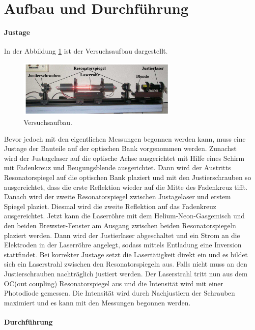 \newpage
\section{Aufbau und Durchführung}
\label{sec:Durchführung}
\paragraph{Justage}
In der Abbildung \ref{fig:aufbau} ist
der Versuchsaufbau dargestellt.
\begin{figure}
  \centering
  \includegraphics[width=0.7\textwidth]{figures/Aufbau.PNG}
  \caption{Versuchsaufbau.}
  \label{fig:aufbau}
\end{figure}
Bevor jedoch mit den eigentlichen Messungen
begonnen werden
kann, muss eine Justage der Bauteile auf der optischen Bank vorgenommen werden.
Zunachst wird der Justagelaser auf die optische Achse
ausgerichtet
mit Hilfe eines Schirm mit Fadenkreuz und Beugungsblende
ausgerichtet.
Dann wird der Austritts Resonatorspiegel
auf die optischen Bank plaziert
und mit den Justierschrauben so ausgereichtet,
dass die erste Reflektion wieder auf die
Mitte des Fadenkreuz tifft.
Danach wird der
zweite Resonatorspiegel zwischen Justagelaser
und erstem Spiegel plaziet.
Diesmal wird die zweite Reflektion
auf das Fadenkreuz ausgereichtet.
Jetzt kann die Laserröhre mit dem Helium-Neon-Gasgemisch und
den beiden Brewster-Fenster am Ausgang
zwischen beiden Resonatorspiegeln
plaziert werden.
Dann wird der Justierlaser abgeschaltet
und ein Strom an die
Elektroden in der Laserröhre
angelegt, sodass mittels Entladung eine Inversion
stattfindet. Bei korrekter
Justage setzt die Lasertätigkeit direkt ein
und es bildet sich ein Laserstrahl
zwischen den Resonatorspiegeln aus.
Falls nicht muss an den Justierschrauben
nachträglich justiert werden.
Der Laserstrahl tritt nun aus dem OC(out coupling) Resonatorspiegel
aus und die Intensität wird mit einer Photodiode gemessen.
Die Intensität wird durch Nachjustiern der Schrauben maximiert und
es kann mit den Messungen begonnen werden.



\paragraph{Durchführung}

